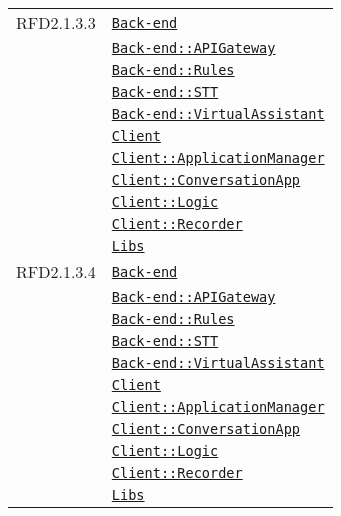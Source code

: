 \begin{longtable}{|>{\centering}m{3cm}|m{10cm}<{\centering}|}
RFD2.1.3.3 & \hyperref[Back-end]{\texttt{Back-end}}\\
& \hyperref[Back-end::APIGateway]{\texttt{Back-end::APIGateway}}\\
& \hyperref[Back-end::Rules]{\texttt{Back-end::Rules}}\\
& \hyperref[Back-end::STT]{\texttt{Back-end::STT}}\\
& \hyperref[Back-end::VirtualAssistant]{\texttt{Back-end::VirtualAssistant}}\\
& \hyperref[Client]{\texttt{Client}}\\
& \hyperref[Client::ApplicationManager]{\texttt{Client::ApplicationManager}}\\
& \hyperref[Client::ConversationApp]{\texttt{Client::ConversationApp}}\\
& \hyperref[Client::Logic]{\texttt{Client::Logic}}\\
& \hyperref[Client::Recorder]{\texttt{Client::Recorder}}\\
& \hyperref[Libs]{\texttt{Libs}}\\ \hline

RFD2.1.3.4 & \hyperref[Back-end]{\texttt{Back-end}}\\
& \hyperref[Back-end::APIGateway]{\texttt{Back-end::APIGateway}}\\
& \hyperref[Back-end::Rules]{\texttt{Back-end::Rules}}\\
& \hyperref[Back-end::STT]{\texttt{Back-end::STT}}\\
& \hyperref[Back-end::VirtualAssistant]{\texttt{Back-end::VirtualAssistant}}\\
& \hyperref[Client]{\texttt{Client}}\\
& \hyperref[Client::ApplicationManager]{\texttt{Client::ApplicationManager}}\\
& \hyperref[Client::ConversationApp]{\texttt{Client::ConversationApp}}\\
& \hyperref[Client::Logic]{\texttt{Client::Logic}}\\
& \hyperref[Client::Recorder]{\texttt{Client::Recorder}}\\
& \hyperref[Libs]{\texttt{Libs}}\\ \hline


\end{longtable}
